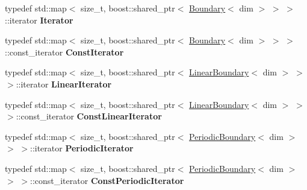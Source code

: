 \begin{DoxyCompactItemize}
\item 
\hypertarget{classnatrium_1_1BoundaryCollection_a48a9256fb603f1bc4b7e04b6feef0feb}{
typedef std::map$<$ size\_\-t, boost::shared\_\-ptr$<$ \hyperlink{classnatrium_1_1Boundary}{Boundary}$<$ dim $>$ $>$ $>$::iterator {\bfseries Iterator}}
\label{classnatrium_1_1BoundaryCollection_a48a9256fb603f1bc4b7e04b6feef0feb}

\item 
\hypertarget{classnatrium_1_1BoundaryCollection_ad617c979f5d65a32f669276fa18702da}{
typedef std::map$<$ size\_\-t, boost::shared\_\-ptr$<$ \hyperlink{classnatrium_1_1Boundary}{Boundary}$<$ dim $>$ $>$ $>$::const\_\-iterator {\bfseries ConstIterator}}
\label{classnatrium_1_1BoundaryCollection_ad617c979f5d65a32f669276fa18702da}

\item 
\hypertarget{classnatrium_1_1BoundaryCollection_a024cb8898b2f085e01e1740fe16667ab}{
typedef std::map$<$ size\_\-t, boost::shared\_\-ptr$<$ \hyperlink{classnatrium_1_1LinearBoundary}{LinearBoundary}$<$ dim $>$ $>$ $>$::iterator {\bfseries LinearIterator}}
\label{classnatrium_1_1BoundaryCollection_a024cb8898b2f085e01e1740fe16667ab}

\item 
\hypertarget{classnatrium_1_1BoundaryCollection_a3d8275d7eba21d128d9b5f057c6c329c}{
typedef std::map$<$ size\_\-t, boost::shared\_\-ptr$<$ \hyperlink{classnatrium_1_1LinearBoundary}{LinearBoundary}$<$ dim $>$ $>$ $>$::const\_\-iterator {\bfseries ConstLinearIterator}}
\label{classnatrium_1_1BoundaryCollection_a3d8275d7eba21d128d9b5f057c6c329c}

\item 
\hypertarget{classnatrium_1_1BoundaryCollection_a9c641c34778fdb95ff98827c818773e6}{
typedef std::map$<$ size\_\-t, boost::shared\_\-ptr$<$ \hyperlink{classnatrium_1_1PeriodicBoundary}{PeriodicBoundary}$<$ dim $>$ $>$ $>$::iterator {\bfseries PeriodicIterator}}
\label{classnatrium_1_1BoundaryCollection_a9c641c34778fdb95ff98827c818773e6}

\item 
\hypertarget{classnatrium_1_1BoundaryCollection_aa3e1ff6ad230abd5fb3cedc303e00678}{
typedef std::map$<$ size\_\-t, boost::shared\_\-ptr$<$ \hyperlink{classnatrium_1_1PeriodicBoundary}{PeriodicBoundary}$<$ dim $>$ $>$ $>$::const\_\-iterator {\bfseries ConstPeriodicIterator}}
\label{classnatrium_1_1BoundaryCollection_aa3e1ff6ad230abd5fb3cedc303e00678}

\end{DoxyCompactItemize}
